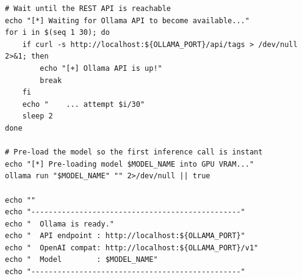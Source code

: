 \documentclass[11pt]{article}
\begin{document}
\begin{lstlisting}[style=bashstyle, caption={start\_ollama\_server\_first.sh}]
# Wait until the REST API is reachable
echo "[*] Waiting for Ollama API to become available..."
for i in $(seq 1 30); do
    if curl -s http://localhost:${OLLAMA_PORT}/api/tags > /dev/null 2>&1; then
        echo "[+] Ollama API is up!"
        break
    fi
    echo "    ... attempt $i/30"
    sleep 2
done

# Pre-load the model so the first inference call is instant
echo "[*] Pre-loading model $MODEL_NAME into GPU VRAM..."
ollama run "$MODEL_NAME" "" 2>/dev/null || true

echo ""
echo "------------------------------------------------"
echo "  Ollama is ready."
echo "  API endpoint : http://localhost:${OLLAMA_PORT}"
echo "  OpenAI compat: http://localhost:${OLLAMA_PORT}/v1"
echo "  Model        : $MODEL_NAME"
echo "------------------------------------------------"
\end{lstlisting}

\newpage
\end{document}
